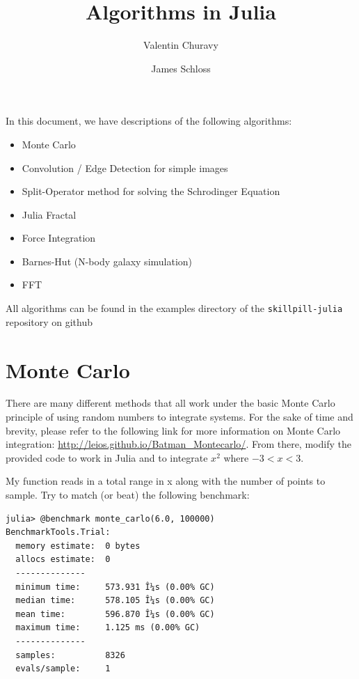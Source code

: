 \documentclass[11pt]{article}
\title{\textbf{Algorithms in Julia}}
\author{Valentin Churavy \and James Schloss}
\date{}
\begin{document}
\maketitle
In this document, we have descriptions of the following algorithms:
\begin{itemize}
\item Monte Carlo
\item Convolution / Edge Detection for simple images
\item Split-Operator method for solving the Schrodinger Equation
\item Julia Fractal
\item Force Integration
\item Barnes-Hut (N-body galaxy simulation)
\item FFT
\end{itemize}

All algorithms can be found in the examples directory of the \texttt{skillpill-julia} repository on github

\newpage
\section*{Monte Carlo}

There are many different methods that all work under the basic Monte Carlo principle of using random numbers to integrate systems.
For the sake of time and brevity, please refer to the following link for more information on Monte Carlo integration: \url{http://leios.github.io/Batman_Montecarlo/}. From there, modify the provided code to work in Julia and to integrate $x^2$ where $-3 < x < 3$.

My function reads in a total range in x along with the number of points to sample. Try to match (or beat) the following benchmark:

\begin{lstlisting}
julia> @benchmark monte_carlo(6.0, 100000)
BenchmarkTools.Trial: 
  memory estimate:  0 bytes
  allocs estimate:  0
  --------------
  minimum time:     573.931 Î¼s (0.00% GC)
  median time:      578.105 Î¼s (0.00% GC)
  mean time:        596.870 Î¼s (0.00% GC)
  maximum time:     1.125 ms (0.00% GC)
  --------------
  samples:          8326
  evals/sample:     1

\end{lstlisting}

\newpage
\end{document}
